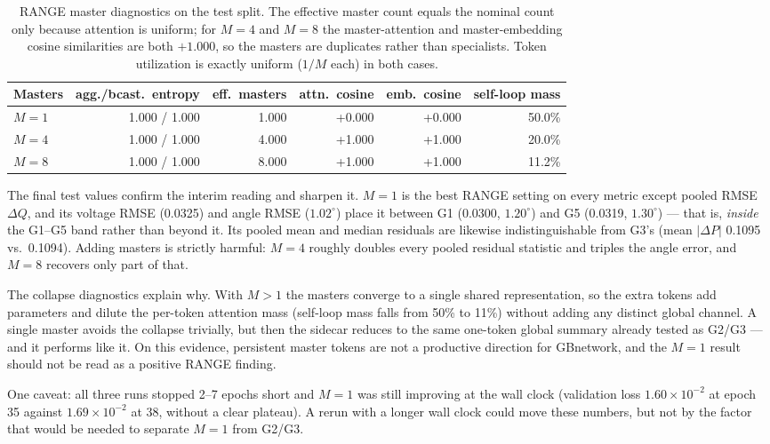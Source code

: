 \documentclass[10pt]{article}
\begin{document}
\begin{table}[H]
\centering\small
\begin{tabular}{lrrrrr}
\toprule
Masters & agg./bcast.\ entropy & eff.\ masters & attn.\ cosine & emb.\ cosine & self-loop mass\\
\midrule
$M=1$ & 1.000 / 1.000 & 1.000 & +0.000 & +0.000 & 50.0\%\\
$M=4$ & 1.000 / 1.000 & 4.000 & +1.000 & +1.000 & 20.0\%\\
$M=8$ & 1.000 / 1.000 & 8.000 & +1.000 & +1.000 & 11.2\%\\
\bottomrule
\end{tabular}
\caption{RANGE master diagnostics on the test split.  The effective master
count equals the nominal count only because attention is uniform; for $M=4$
and $M=8$ the master-attention and master-embedding cosine similarities are
both $+1.000$, so the masters are duplicates rather than specialists.  Token
utilization is exactly uniform ($1/M$ each) in both cases.}
\end{table}

The final test values confirm the interim reading and sharpen it.  $M=1$ is the
best RANGE setting on every metric except pooled RMSE $\Delta Q$, and its
voltage RMSE (0.0325) and angle RMSE ($1.02^\circ$) place it between G1 (0.0300,
$1.20^\circ$) and G5 (0.0319, $1.30^\circ$) --- that is, \emph{inside} the
G1--G5 band rather than beyond it.  Its pooled mean and median residuals are
likewise indistinguishable from G3's (mean $|\Delta P|$ 0.1095 vs.\ 0.1094).
Adding masters is strictly harmful: $M=4$ roughly doubles every pooled residual
statistic and triples the angle error, and $M=8$ recovers only part of that.

The collapse diagnostics explain why.  With $M>1$ the masters converge to a
single shared representation, so the extra tokens add parameters and dilute the
per-token attention mass (self-loop mass falls from 50\% to 11\%) without
adding any distinct global channel.  A single master avoids the collapse
trivially, but then the sidecar reduces to the same one-token global summary
already tested as G2/G3 --- and it performs like it.  On this evidence,
persistent master tokens are not a productive direction for GBnetwork, and the
$M=1$ result should not be read as a positive RANGE finding.

One caveat: all three runs stopped 2--7 epochs short and $M=1$ was still
improving at the wall clock (validation loss $1.60\times10^{-2}$ at epoch 35
against $1.69\times10^{-2}$ at 38, without a clear plateau).  A rerun with a
longer wall clock could move these numbers, but not by the factor that would be
needed to separate $M=1$ from G2/G3.
\end{document}
